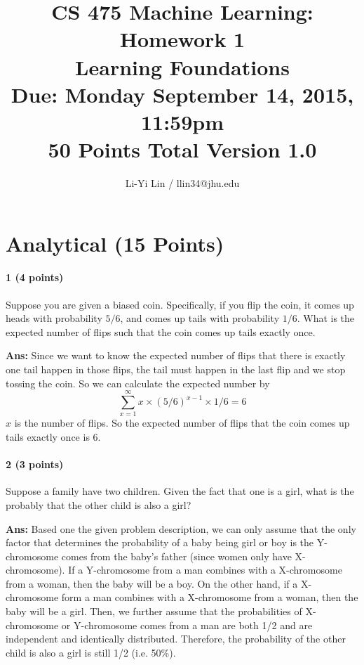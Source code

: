 \documentclass[11pt]{article}
\title{CS 475 Machine Learning: Homework 1\\Learning Foundations\\
\Large{Due: Monday September 14, 2015, 11:59pm}\\
50 Points Total \hspace{1cm} Version 1.0}
\author{Li-Yi Lin / llin34@jhu.edu}
\date{}
\begin{document}
\large
\maketitle
\thispagestyle{headings}

\vspace{-.5in}




\section{Analytical (15 Points)}

\paragraph{1 (4 points)} Suppose you are given a biased coin. Specifically, if you flip the coin, it comes up heads with probability $5/6$, and comes up tails with probability $1/6$.  What is the expected number of flips such that the coin comes up tails exactly once.

\noindent
\textbf{Ans:} 
Since we want to know the expected number of flips that there is exactly one tail happen in those flips, the tail must happen in the last flip and we stop tossing the coin. So we can calculate the expected number by 
$$\sum_{x = 1}^{\infty} x \times (5/6)^{x-1} \times 1/6 = 6$$
$x$ is the number of flips.
So the expected number of flips that the coin comes up tails exactly once is 6.


\paragraph{2 (3 points)} Suppose a family have two children. Given the fact that one is a girl, what is the probably that the other child is also a girl?

\noindent
\textbf{Ans:}
Based one the given problem description, we can only assume that the only factor that determines the probability of a baby being girl or boy is the Y-chromosome comes from the baby's father (since women only have X-chromosome). If a Y-chromosome from a man combines with a X-chromosome from a woman, then the baby will be a boy. On the other hand, if a X-chromosome form a man combines with a X-chromosome from a woman, then the baby will be a girl. Then, we further assume that the probabilities of X-chromosome or Y-chromosome comes from a man are both 1/2 and are independent and identically distributed. Therefore, the probability of the other child is also a girl is still 1/2 (i.e. 50\%).
\end{document}
